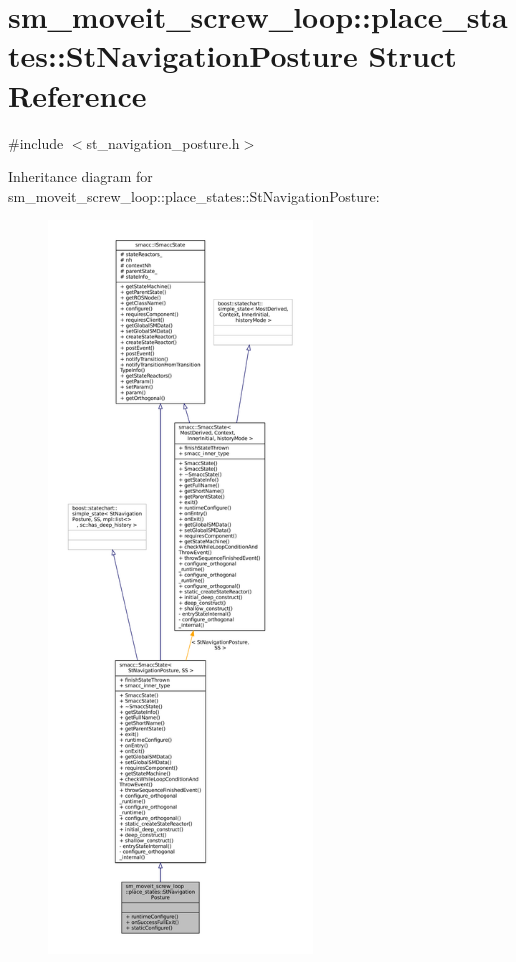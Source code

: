 \hypertarget{structsm__moveit__screw__loop_1_1place__states_1_1StNavigationPosture}{}\section{sm\+\_\+moveit\+\_\+screw\+\_\+loop\+:\+:place\+\_\+states\+:\+:St\+Navigation\+Posture Struct Reference}
\label{structsm__moveit__screw__loop_1_1place__states_1_1StNavigationPosture}


{\ttfamily \#include $<$st\+\_\+navigation\+\_\+posture.\+h$>$}



Inheritance diagram for sm\+\_\+moveit\+\_\+screw\+\_\+loop\+:\+:place\+\_\+states\+:\+:St\+Navigation\+Posture\+:
\nopagebreak
\begin{figure}[H]
\begin{center}
\leavevmode
\includegraphics[height=550pt]{structsm__moveit__screw__loop_1_1place__states_1_1StNavigationPosture__inherit__graph}
\end{center}
\end{figure}



